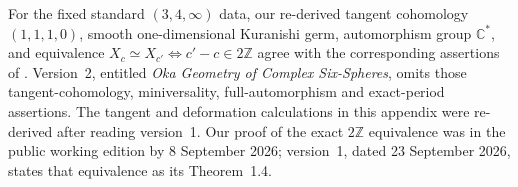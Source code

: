 \begin{remark}\label{night:P5.7}
For the fixed standard $(3,4,\infty)$ data, our re-derived tangent
cohomology $(1,1,1,0)$, smooth one-dimensional Kuranishi germ,
automorphism group $\mathbb C^*$, and equivalence
$X_c\simeq X_{c'}\Longleftrightarrow c'-c\in2\mathbb Z$
agree with the corresponding assertions of
\cite{DuEtAl2026v1}. Version~2, entitled
\emph{Oka Geometry of Complex Six-Spheres}, omits those
tangent-cohomology, miniversality, full-automorphism and exact-period
assertions. The tangent and deformation calculations in this appendix
were re-derived after reading version~1. Our proof of the exact
$2\mathbb Z$ equivalence was in the public working edition by
8 September 2026; version~1, dated 23 September 2026, states that
equivalence as its Theorem~1.4.
\end{remark}
